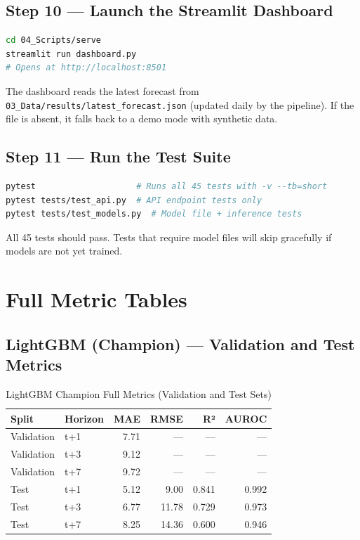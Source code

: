 \section{Step 10 — Launch the Streamlit Dashboard}

\begin{lstlisting}[language=bash]
cd 04_Scripts/serve
streamlit run dashboard.py
# Opens at http://localhost:8501
\end{lstlisting}

The dashboard reads the latest forecast from
\texttt{03\_Data/results/latest\_forecast.json} (updated daily by the pipeline).
If the file is absent, it falls back to a demo mode with synthetic data.

\section{Step 11 — Run the Test Suite}

\begin{lstlisting}[language=bash]
pytest                    # Runs all 45 tests with -v --tb=short
pytest tests/test_api.py  # API endpoint tests only
pytest tests/test_models.py  # Model file + inference tests
\end{lstlisting}

All 45 tests should pass. Tests that require model files will skip gracefully
if models are not yet trained.


\chapter{Full Metric Tables}
\label{app:metrics}

\section{LightGBM (Champion) — Validation and Test Metrics}

\begin{table}[H]
\centering
\caption{LightGBM Champion Full Metrics (Validation and Test Sets)}
\begin{tabular}{llrrrr}
\toprule
\textbf{Split} & \textbf{Horizon} & \textbf{MAE} & \textbf{RMSE} & \textbf{R²} & \textbf{AUROC} \\
\midrule
Validation & t+1 & 7.71  & ---   & ---   & --- \\
Validation & t+3 & 9.12  & ---   & ---   & --- \\
Validation & t+7 & 9.72  & ---   & ---   & --- \\
\midrule
Test       & t+1 & 5.12  & 9.00  & 0.841 & 0.992 \\
Test       & t+3 & 6.77  & 11.78 & 0.729 & 0.973 \\
Test       & t+7 & 8.25  & 14.36 & 0.600 & 0.946 \\
\bottomrule
\end{tabular}
\end{table}

